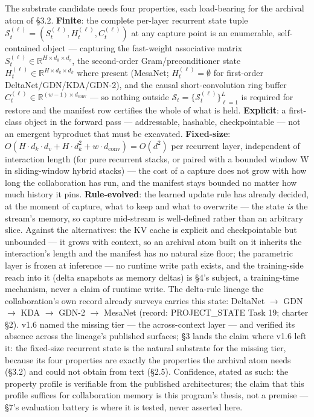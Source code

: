 \documentclass[11pt]{article}
\begin{document}
The substrate candidate needs four properties, each load-bearing for the archival atom of \S{}3.2. \textbf{Finite}: the complete per-layer recurrent state tuple \(\mathcal{S}_t^{(\ell)} = (S_t^{(\ell)}, H_t^{(\ell)}, C_t^{(\ell)})\) at any capture point is an enumerable, self-contained object --- capturing the fast-weight associative matrix \(S_t^{(\ell)} \in \mathbb{R}^{H\times d_k\times d_v}\), the second-order Gram/preconditioner state \(H_t^{(\ell)} \in \mathbb{R}^{H\times d_k\times d_k}\) where present (MesaNet; \(H_t^{(\ell)} = \emptyset\) for first-order DeltaNet/GDN/KDA/GDN-2), and the causal short-convolution ring buffer \(C_t^{(\ell)} \in \mathbb{R}^{(w-1)\times d_{\text{conv}}}\) --- so nothing outside \(\mathcal{S}_t = \{\mathcal{S}_t^{(\ell)}\}_{\ell=1}^{L}\) is required for restore and the manifest row certifies the whole of what is held. \textbf{Explicit}: a first-class object in the forward pass --- addressable, hashable, checkpointable --- not an emergent byproduct that must be excavated. \textbf{Fixed-size}: \(O(H\cdot d_k\cdot d_v + H\cdot d_k^{2} + w\cdot d_{\text{conv}}) = O(d^{2})\) per recurrent layer, independent of interaction length (for pure recurrent stacks, or paired with a bounded window W in sliding-window hybrid stacks) --- the cost of a capture does not grow with how long the collaboration has run, and the manifest stays bounded no matter how much history it pins. \textbf{Rule-evolved}: the learned update rule has already decided, at the moment of capture, what to keep and what to overwrite --- the state \emph{is} the stream's memory, so capture mid-stream is well-defined rather than an arbitrary slice. Against the alternatives: the KV cache is explicit and checkpointable but unbounded --- it grows with context, so an archival atom built on it inherits the interaction's length and the manifest has no natural size floor; the parametric layer is frozen at inference --- no runtime write path exists, and the training-side reach into it (delta snapshots as memory deltas) is \S{}4's subject, a training-time mechanism, never a claim of runtime write. The delta-rule lineage the collaboration's own record already surveys carries this state: DeltaNet \(\to\) GDN \(\to\) KDA \(\to\) GDN-2 \(\to\) MesaNet (record: PROJECT\_STATE Task 19; charter \S{}2). v1.6 named the missing tier --- the across-context layer --- and verified its absence across the lineage's published surfaces; \S{}3 lands the claim where v1.6 left it: the fixed-size recurrent state is the natural substrate for the missing tier, because its four properties are exactly the properties the archival atom needs (\S{}3.2) and could not obtain from text (\S{}2.5). Confidence, stated as such: the property profile is verifiable from the published architectures; the claim that this profile suffices for collaboration memory is this program's thesis, not a premise --- \S{}7's evaluation battery is where it is tested, never asserted here.
\end{document}
